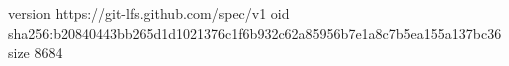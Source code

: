 version https://git-lfs.github.com/spec/v1
oid sha256:b20840443bb265d1d1021376c1f6b932c62a85956b7e1a8c7b5ea155a137bc36
size 8684
